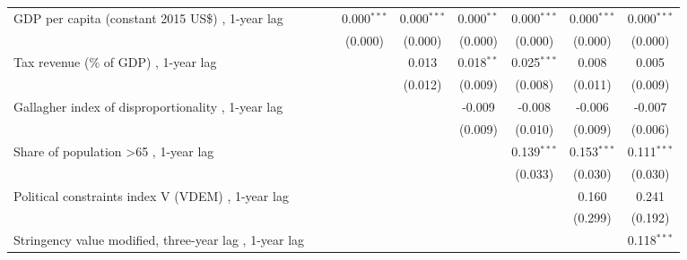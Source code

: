 \begin{table}[htbp]
\begin{tabular}{lcccccccc}
      GDP per capita (constant 2015 US\$) , 1-year lag                         &         &         & 0.000$^{***}$ & 0.000$^{***}$ & 0.000$^{**}$   & 0.000$^{***}$  & 0.000$^{***}$  & 0.000$^{***}$\\   
                                                                               &         &         & (0.000)       & (0.000)       & (0.000)        & (0.000)        & (0.000)        & (0.000)\\   
      Tax revenue (\% of GDP) , 1-year lag                                     &         &         &               & 0.013         & 0.018$^{**}$   & 0.025$^{***}$  & 0.008          & 0.005\\   
                                                                               &         &         &               & (0.012)       & (0.009)        & (0.008)        & (0.011)        & (0.009)\\   
      Gallagher index of disproportionality , 1-year lag                       &         &         &               &               & -0.009         & -0.008         & -0.006         & -0.007\\   
                                                                               &         &         &               &               & (0.009)        & (0.010)        & (0.009)        & (0.006)\\   
      Share of population >65 , 1-year lag                                     &         &         &               &               &                & 0.139$^{***}$  & 0.153$^{***}$  & 0.111$^{***}$\\   
                                                                               &         &         &               &               &                & (0.033)        & (0.030)        & (0.030)\\   
      Political constraints index V (VDEM) , 1-year lag                        &         &         &               &               &                &                & 0.160          & 0.241\\   
                                                                               &         &         &               &               &                &                & (0.299)        & (0.192)\\   
      Stringency value modified, three-year lag , 1-year lag                   &         &         &               &               &                &                &                & 0.118$^{***}$\\   

\end{tabular}
\end{table}
